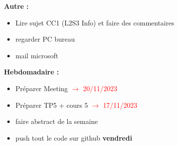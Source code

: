 \textbf{Autre :}
\begin{itemize}[label=$\square$] 
	\item[\done] Lire sujet CC1 (L2S3 Info) et faire des commentaires
	\item[\done] regarder PC bureau
	\item[\done] mail microsoft
\end{itemize}
\textbf{Hebdomadaire :}
\begin{itemize}[label=$\square$] 
	\item Préparer Meeting \textcolor{red}{$\rightarrow$ 20/11/2023}
	\item[\done] Préparer TP5 + cours 5 \textcolor{red}{$\rightarrow$ 17/11/2023}
	\item faire abstract de la semaine 
	\item push tout le code sur github \textbf{vendredi}
\end{itemize}